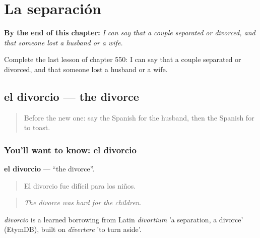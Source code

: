 
\chapter{La separación}
\label{ch:es-la-separacion}

\begin{chapteropening}
\textbf{By the end of this chapter:} \emph{I can say that a couple separated or divorced, and that someone lost a husband or a wife.}

Complete the last lesson of chapter 550: I can say that a couple separated or divorced, and that someone lost a husband or a wife.
\end{chapteropening}

\section[el divorcio]{el divorcio — the divorce}

\label{lesson:ES-C550-divorcio}



\begin{quote}
Before the new one: say the Spanish for the husband, then the Spanish for to toast.
\end{quote}

\subsection*{You'll want to know: el divorcio}
\textbf{el divorcio} — \textquotedblleft{}the divorce\textquotedblright{}.

\begin{quote}
El divorcio fue difícil para los niños.
\end{quote}

\begin{quote}
\emph{The divorce was hard for the children.}
\end{quote}

\begin{cousinweb}
\emph{divorcio} is a learned borrowing from Latin \emph{dīvortium} 'a separation, a divorce' (EtymDB), built on \emph{dīvertere} 'to turn aside'.
\end{cousinweb}

